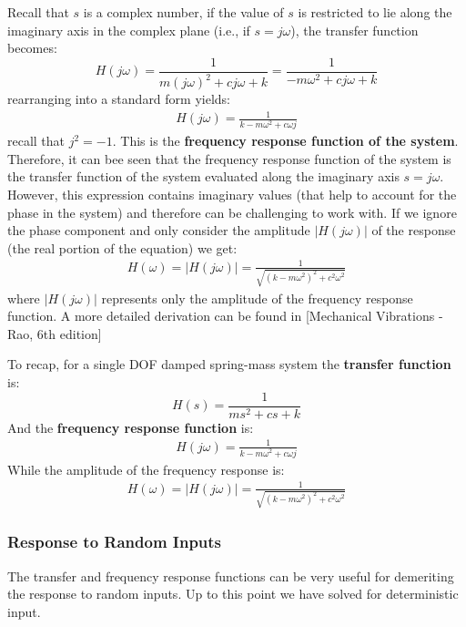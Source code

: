 \documentclass[12pt,letter]{article}
\numberwithin{ex}{section} %
\numberwithin{re}{section} %
\begin{document}
Recall that $s$ is a complex number, if the value of $s$ is restricted to lie along the imaginary axis in the complex plane (i.e., if $s = j\omega$), the transfer function becomes:
\begin{equation}
H(j\omega) = \frac{1}{m(j\omega)^2+cj\omega+k} = \frac{1}{-m\omega^2+cj\omega+k} 
\end{equation}
rearranging into a standard form yields:
\begin{eqnarray}
H(j\omega) = \frac{1}{k-m\omega^2+c\omega j}
\end{eqnarray}
recall that $j^2=-1$. This is the \textbf{frequency response function of the system}. Therefore, it can bee seen that the frequency response function of the system is the transfer function of the system evaluated along the imaginary axis $s=j\omega$. However, this expression contains imaginary values (that help to account for the phase in the system) and therefore can be challenging to work with. If we ignore the phase component and only consider the amplitude $|H(j\omega)|$ of the response (the real portion of the equation) we get:
\begin{eqnarray}
H(\omega) = |H(j\omega)| = \frac{1}{\sqrt{(k-m\omega^2)^2+c^2\omega^2}}
\end{eqnarray}
where $|H(j\omega)|$ represents only the amplitude of the frequency response function. A more detailed derivation can be found in [Mechanical Vibrations - Rao, 6th edition]



To recap, for a single DOF damped spring-mass system the \textbf{transfer function} is:
\begin{equation}
H(s) = \frac{1}{ms^2+cs+k}
\end{equation}
And the \textbf{frequency response function} is:
\begin{eqnarray}
H(j\omega) = \frac{1}{k-m\omega^2+c\omega j}
\end{eqnarray}
While the amplitude of the frequency response is:
\begin{eqnarray}
H(\omega) = |H(j\omega)| = \frac{1}{\sqrt{(k-m\omega^2)^2+c^2\omega^2}}
\end{eqnarray}




\subsubsection{Response to Random Inputs}
The transfer and frequency response functions can be very useful for demeriting the response to random inputs. Up to this point we have solved for deterministic input. 
\end{document}
